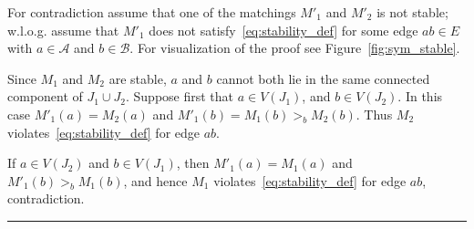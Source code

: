 \documentclass[3p,times]{elsarticle}
\newenvironment{proof}{{\bf Proof:  }}{\hfill\rule{2mm}{2mm}}
\begin{document}
\begin{proof}
  For contradiction assume
  that one of the matchings $M'_1$ and $M'_2$ is not stable; w.l.o.g. assume that
  $M'_1$ does not satisfy~\eqref{eq:stability_def} for some edge
  $ab\in E$ with $a\in\mathcal{A}$ and $b\in\mathcal{B}$. For visualization of the proof see Figure~\ref{fig:sym_stable}.

  Since $M_1$ and $M_2$ are stable, $a$ and $b$ cannot both lie in the
  same connected component of $J_1 \cup J_2$. Suppose first that $a \in
  V(J_1)$, and $b \in V(J_2)$. In this case $M'_1(a)=M_2(a)$ and
  $M'_1(b) = M_1(b) >_b M_2(b)$. Thus $M_2$
  violates~\eqref{eq:stability_def} for edge $ab$. 

  If $a\in V(J_2)$
  and $b\in V(J_1)$, then $M'_1(a)=M_1(a)$ and $M'_1(b)>_b M_1(b)$,
  and hence $M_1$ violates~\eqref{eq:stability_def} for edge $ab$,
  contradiction.
\end{proof}
\end{document}
